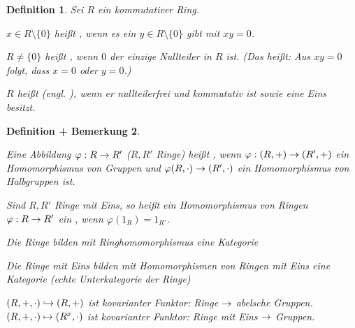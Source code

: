 \documentclass[a4paper,10pt,german]{scrbook}
\theoremstyle{saetze}
\theoremstyle{definitionen}
\newtheorem{Def}{Definition}[section]
\newtheorem{DefBem}[Def]{Definition + Bemerkung}
\begin{document}
\begin{Def}
Sei $R$ ein kommutativer Ring.
\begin{enum}
\item $x\in R\setminus\{0\}$ heißt , wenn es ein
$y \in R \setminus \{0\}$ gibt mit $xy = 0$.
\item $R\ne \{0\}$ heißt , wenn $0$ der einzige
Nullteiler in $R$ ist. (Das heißt: Aus $xy = 0$ folgt, dass $x=0$ oder
$y=0$.)
\item $R$ heißt  (engl. ), wenn er
nullteilerfrei und kommutativ ist sowie eine Eins besitzt.
\end{enum}

\end{Def}
  
\begin{DefBem}
\begin{enum}
\item Eine Abbildung $\varphi: R \rightarrow R'$ ($R,R'$ Ringe) heißt
, wenn $\varphi: (R,+) \rightarrow (R',+)$ ein
Homomorphismus von Gruppen und $\varphi(R,\cdot) \rightarrow (R',\cdot)$ ein 
Homomorphismus von Halbgruppen ist.
\item Sind $R,R'$ Ringe mit Eins, so heißt ein Homomorphismus von Ringen
$\varphi: R \rightarrow R'$ ein , wenn
$\varphi(1_R) = 1_{R'}$.
\item Die Ringe bilden mit Ringhomomorphismus eine Kategorie
\item Die Ringe mit Eins bilden mit Homomorphismen von Ringen mit
Eins eine Kategorie (echte Unterkategorie der Ringe)
\item ${(R,+,\cdot)}
\hookrightarrow {(R,+)}$ ist
kovarianter Funktor: Ringe $\rightarrow$ abelsche Gruppen.
\medskip\newline$(R,+, \cdot) \mapsto (R^x, \cdot)$ ist kovarianter
Funktor: Ringe mit Eins $\rightarrow$ Gruppen.
\end{enum}
\end{DefBem}
\end{document}
